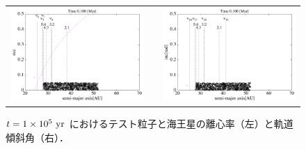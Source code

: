 \documentclass[11pt,a4paper,oneside,onecolumn]{jreport}
\begin{document}
\begin{figure}[H]
\begin{tabular}{ccc}
\begin{minipage}[t]{0.45\hsize}
\centering
\includegraphics[width=8cm]{./image/kuiper_ecc_100kyr.pdf}
\end{minipage} &
\begin{minipage}[t]{0.1\hsize}
\end{minipage} &
\begin{minipage}[t]{0.45\hsize}
\centering
\includegraphics[width=8cm]{./image/kuiper_inc_100kyr.pdf}
\end{minipage}\\
%
\end{tabular}
\caption{$t = 1 \times 10^5\ {\rm yr}$ におけるテスト粒子と海王星の離心率（左）と軌道傾斜角（右）．\label{fig:kuiper_ecc_inc_100kyr}}
\end{figure}
\end{document}
